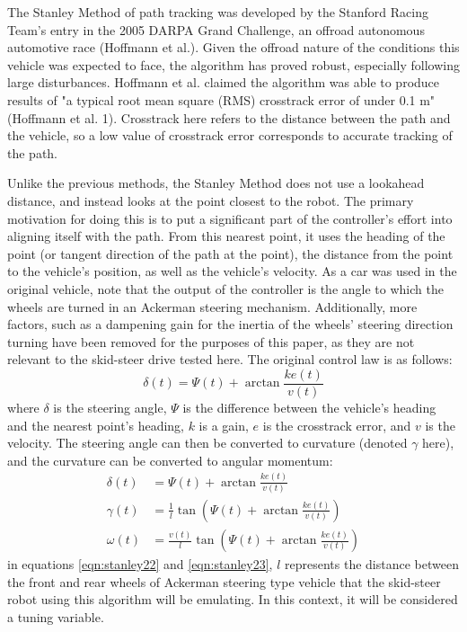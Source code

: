 \documentclass[mla7]{mla}
\begin{document}
\begin{paper}
The Stanley Method of path tracking was developed by the Stanford Racing Team's entry in the 2005 DARPA Grand Challenge, an offroad autonomous automotive race (Hoffmann et al.). Given the offroad nature of the conditions this vehicle was expected to face, the algorithm has proved robust, especially following large disturbances. Hoffmann et al. claimed the algorithm was able to produce results of "a typical root mean square (RMS) crosstrack error of under 0.1 m" (Hoffmann et al. 1). Crosstrack here refers to the distance between the path and the vehicle, so a low value of crosstrack error corresponds to accurate tracking of the path.

Unlike the previous methods, the Stanley Method does not use a lookahead distance, and instead looks at the point closest to the robot. The primary motivation for doing this is to put a significant part of the controller's effort into aligning itself with the path. From this nearest point, it uses the heading of the point (or tangent direction of the path at the point), the distance from the point to the vehicle's position, as well as the vehicle's velocity. As a car was used in the original vehicle, note that the output of the controller is the angle to which the wheels are turned in an Ackerman steering mechanism. Additionally, more factors, such as a dampening gain for the inertia of the wheels' steering direction turning have been removed for the purposes of this paper, as they are not relevant to the skid-steer drive tested here. The original control law is as follows:
\begin{equation}
\delta(t)=\Psi(t)+\arctan{\frac{ke(t)}{v(t)}}
\end{equation}
where $\delta$ is the steering angle, $\Psi$ is the difference between the vehicle's heading and the nearest point's heading, $k$ is a gain, $e$ is the crosstrack error, and $v$ is the velocity.
The steering angle can then be converted to curvature (denoted $\gamma$ here), and the curvature can be converted to angular momentum:
\begin{subequations}
\begin{align}
\delta(t)&=\Psi(t)+\arctan{\frac{ke(t)}{v(t)}} \\
\gamma(t)&=\frac{1}{l}\tan{(\Psi(t)+\arctan{\frac{ke(t)}{v(t)}})} \label{eqn:stanley22}\\
\omega(t)&=\frac{v(t)}{l}\tan{(\Psi(t)+\arctan{\frac{ke(t)}{v(t)}})} \label{eqn:stanley23}
\end{align}
\end{subequations}
in equations \ref{eqn:stanley22} and \ref{eqn:stanley23}, $l$ represents the distance between the front and rear wheels of Ackerman steering type vehicle that the skid-steer robot using this algorithm will be emulating. In this context, it will be considered a tuning variable.


\end{paper}
\end{document}
